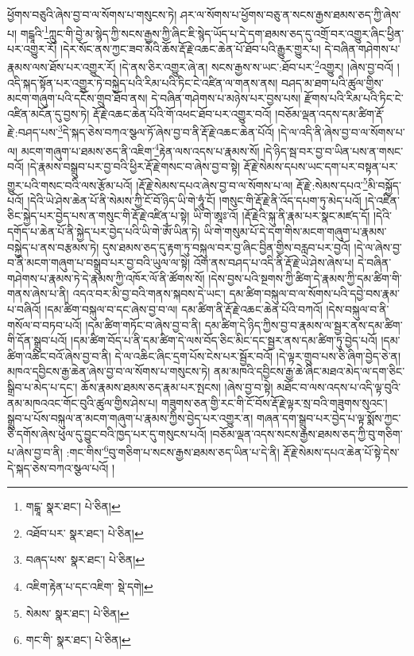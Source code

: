 ཕྱོགས་བཅུའི་ཞེས་བྱ་བ་ལ་སོགས་པ་གསུངས་ཏེ། ཤར་ལ་སོགས་པ་ཕྱོགས་བཅུ་ན་སངས་རྒྱས་ཐམས་ཅད་ཀྱི་ཞེས་པ། གངྒཱའི་\footnote{གངྒཱ་  སྣར་ཐང་།  པེ་ཅིན། }ཀླུང་གི་བྱེ་མ་སྙེད་ཀྱི་སངས་རྒྱས་ཀྱི་ཞིང་ཇི་སྙེད་ཡོད་པ་དེ་དག་ཐམས་ཅད་དུ་འགྲོ་བར་འགྱུར་ཞིང་ཕྱིན་པར་འགྱུར་རོ། །དེར་སོང་ནས་ཀྱང་ཟབ་མོའི་ཆོས་རྡོ་རྗེ་འཆང་ཆེན་པོ་ཐོབ་པའི་རྒྱུར་གྱུར་པ། དེ་བཞིན་གཤེགས་པ་རྣམས་ལས་ཐོས་པར་འགྱུར་རོ། །དེ་ནས་ཅིར་འགྱུར་ཞེ་ན། སངས་རྒྱས་ས་ཡང་:ཐོབ་པར་\footnote{འཐོབ་པར་  སྣར་ཐང་།  པེ་ཅིན། }འགྱུར། །ཞེས་བྱ་བའོ། །འདི་སྐད་སྟོན་པར་འགྱུར་ཏེ་བསྐྱེད་པའི་རིམ་པའི་ཏིང་ངེ་འཛིན་ལ་གནས་ནས། བཤད་མ་ཐག་པའི་ཚུལ་གྱིས་མངག་གཞུག་པའི་དངོས་གྲུབ་ཐོབ་ནས། དེ་བཞིན་གཤེགས་པ་མཉེས་པར་བྱས་པས། རྫོགས་པའི་རིམ་པའི་ཏིང་ངེ་འཛིན་མངོན་དུ་བྱས་ཏེ། རྡོ་རྗེ་འཆང་ཆེན་པོའི་གོ་འཕང་ཐོབ་པར་འགྱུར་བའོ། །བཅོམ་ལྡན་འདས་དམ་ཚིག་རྡོ་རྗེ་:བཤད་པས་\footnote{བཞད་པས་  སྣར་ཐང་།  པེ་ཅིན། }དེ་སྐད་ཅེས་བཀའ་སྩལ་ཏོ་ཞེས་བྱ་བ་ནི་རྡོ་རྗེ་འཆང་ཆེན་པོའོ། །དེ་ལ་འདི་ནི་ཞེས་བྱ་བ་ལ་སོགས་པ་ལ། མངག་གཞུག་པ་ཐམས་ཅད་ནི་འཇིག་\footnote{འཇིག་རྟེན་པ་དང་འཇིག་  སྡེ་དགེ། }རྟེན་ལས་འདས་པ་རྣམས་སོ། །དེ་ཉིད་སྦ་བར་བྱ་བ་ཡིན་པས་ན་གསང་བའོ། །དེ་རྣམས་བསྒྲུབ་པར་བྱ་བའི་ཕྱིར་རྡོ་རྗེ་གསང་བ་ཞེས་བྱ་བ་སྟེ། རྡོ་རྗེ་སེམས་དཔས་ཡང་དག་པར་བསྟན་པར་གྱུར་པའི་གསང་བའི་ལས་རྩོམ་པའོ། །རྡོ་རྗེ་སེམས་དཔའ་ཞེས་བྱ་བ་ལ་སོགས་པ་ལ། རྡོ་རྗེ་:སེམས་དཔའ་\footnote{སེམས་  སྣར་ཐང་།  པེ་ཅིན། }མི་བསྐྱོད་པའོ། །དེའི་ཡེ་ཤེས་ཆེན་པོ་ནི་སེམས་ཀྱི་ངོ་བོ་ཉིད་ཡི་གེ་ཧཱུཾ་ངོ། །གསུང་གི་རྡོ་རྗེ་ནི་འོད་དཔག་ཏུ་མེད་པའོ། །དེ་འཛིན་ཅིང་སྐྱེད་པར་བྱེད་པས་ན་གསུང་གི་རྡོ་རྗེ་འཛིན་པ་སྟེ། ཡི་གེ་ཨཱཿ་འོ། །རྡོ་རྗེའི་སྐུ་ནི་རྣམ་པར་སྣང་མཛད་དོ། །དེའི་དགོད་པ་ཆེན་པོ་ནི་སྐྱེད་པར་བྱེད་པའི་ཡི་གེ་ཨོཾ་ཡིན་ཏེ། ཡི་གེ་གསུམ་པོ་དེ་དག་གིས་མངག་གཞུག་པ་རྣམས་བསྐྱེད་པ་ནས་བརྩམས་ཏེ། དུས་ཐམས་ཅད་དུ་རྟག་ཏུ་བསྐུལ་བར་བྱ་ཞིང་བྱིན་གྱིས་བརླབ་པར་བྱའོ། །དེ་ལ་ཞེས་བྱ་བ་ནི་མངག་གཞུག་པ་བསྒྲུབ་པར་བྱ་བའི་ཡུལ་ལ་སྟེ། འོག་ནས་བཤད་པ་འདི་ནི་རྡོ་རྗེ་ཡེ་ཤེས་ཞེས་པ། དེ་བཞིན་གཤེགས་པ་རྣམས་ཏེ་དེ་རྣམས་ཀྱི་འཁོར་ལོ་ནི་ཚོགས་སོ། །དེས་བྱས་པའི་སྔགས་ཀྱི་ཚིག་དེ་རྣམས་ཀྱི་དམ་ཚིག་གི་གནས་ཞེས་པ་ནི། འདའ་བར་མི་བྱ་བའི་གནས་སྐབས་དེ་ཡང་། དམ་ཚིག་བསྐུལ་བ་ལ་སོགས་པའི་དབྱེ་བས་རྣམ་པ་བཞིའོ། །དམ་ཚིག་བསྐུལ་བ་དང་ཞེས་བྱ་བ་ལ། དམ་ཚིག་ནི་རྡོ་རྗེ་འཆང་ཆེན་པོའི་བཀའོ། །དེས་བསྐུལ་བ་ནི་གསོལ་བ་བཏབ་པའོ། །དམ་ཚིག་གཏོང་བ་ཞེས་བྱ་བ་ནི། དམ་ཚིག་དེ་ཉིད་ཀྱིས་བྱ་བ་རྣམས་ལ་སྦྱར་ནས་དམ་ཚིག་གི་དོན་སྒྲུབ་པའོ། །དམ་ཚིག་བོད་པ་ནི་དམ་ཚིག་དེ་ལས་བོད་ཅིང་མིང་དང་སྦྱར་ནས་དམ་ཚིག་ཏུ་བྱེད་པའོ། །དམ་ཚིག་འཆིང་བའོ་ཞེས་བྱ་བ་ནི། དེ་ལ་འཆིང་ཞིང་དྲག་པོས་ངེས་པར་སྦྱོར་བའོ། །དེ་ལྟར་གྲུབ་པས་ཅི་ཞིག་བྱེད་ཅེ་ན། མཁའ་དབྱིངས་རྒྱ་ཆེན་ཞེས་བྱ་བ་ལ་སོགས་པ་གསུངས་ཏེ། ནམ་མཁའི་དབྱིངས་རྒྱ་ཆེ་ཞིང་མཐའ་མེད་ལ་དག་ཅིང་སྒྲིབ་པ་མེད་པ་དང་། ཆོས་རྣམས་ཐམས་ཅད་རྣམ་པར་སྤངས། །ཞེས་བྱ་བ་སྟེ། མཐོང་བ་ལས་འདས་པ་འདི་ལྟ་བུའི་ནམ་མཁའའང་གོང་བུའི་ཚུལ་གྱིས་ཤེས་པ། གཟུགས་ཅན་གྱི་རང་གི་ངོ་བོས་རྡོ་རྗེ་ལྟར་སྲ་བའི་གཟུགས་སུའང་། སྒྲུབ་པ་པོས་བསྐུལ་ན་མངག་གཞུག་པ་རྣམས་ཀྱིས་བྱེད་པར་འགྱུར་ན། གཞན་དག་སྒྲུབ་པར་བྱེད་པ་ལྟ་སྨོས་ཀྱང་ཅི་དགོས་ཞེས་ཕུལ་དུ་བྱུང་བའི་ཁྱད་པར་དུ་གསུངས་པའོ། །བཅོམ་ལྡན་འདས་སངས་རྒྱས་ཐམས་ཅད་ཀྱི་བུ་གཅིག་པ་ཞེས་བྱ་བ་ནི། :གང་གིས་\footnote{གང་གི་  སྣར་ཐང་།  པེ་ཅིན། }བུ་གཅིག་པ་སངས་རྒྱས་ཐམས་ཅད་ཡིན་པ་དེ་ནི། རྡོ་རྗེ་སེམས་དཔའ་ཆེན་པོ་སྟེ་དེས་དེ་སྐད་ཅེས་བཀའ་སྩལ་པའོ། །
